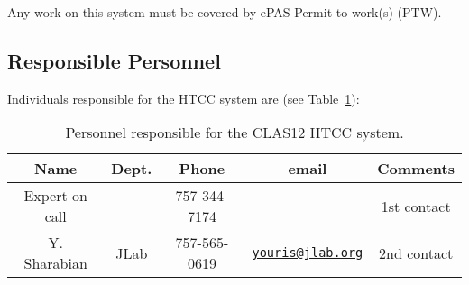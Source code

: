 Any work on this system must be covered by ePAS Permit to work(s) (PTW).

\subsection{Responsible Personnel}

Individuals responsible for the HTCC system are (see Table~\ref{tb:htcc}):

\begin{table}[!htb]
\centering
\begin{tabular}{|c|c|c|c|c|} \hline
Name          & Dept.& Phone        & email &Comments \\ \hline
Expert on call&      & 757-344-7174 &       & 1st contact \\ \hline
Y. Sharabian  & JLab & 757-565-0619 &\href{mailto:youris@jlab.org}{\nolinkurl{youris@jlab.org}}&2nd contact \\ \hline
\end{tabular}
\caption{Personnel responsible for the CLAS12 HTCC system.} 
\label{tb:htcc}
\end{table}

